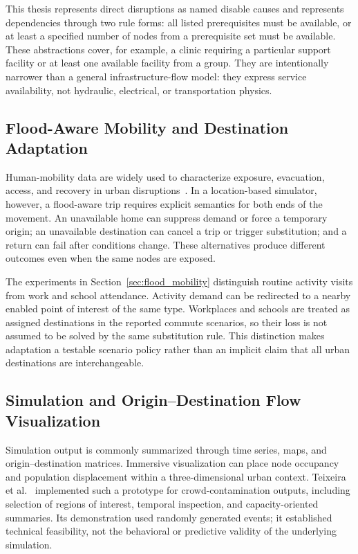 \documentclass[pdflatex,sn-mathphys-num]{sn-jnl}%
\theoremstyle{thmstyleone}%
\theoremstyle{thmstyletwo}%
\theoremstyle{thmstylethree}%
\begin{document}
This thesis represents direct disruptions as named disable causes and represents dependencies through two rule forms: all listed prerequisites must be available, or at least a specified number of nodes from a prerequisite set must be available. These abstractions cover, for example, a clinic requiring a particular support facility or at least one available facility from a group. They are intentionally narrower than a general infrastructure-flow model: they express service availability, not hydraulic, electrical, or transportation physics.

\subsection{Flood-Aware Mobility and Destination Adaptation}
\label{related:flood_mobility}

Human-mobility data are widely used to characterize exposure, evacuation, access, and recovery in urban disruptions~\citep{haraguchi2022mobilityDataReview}. In a location-based simulator, however, a flood-aware trip requires explicit semantics for both ends of the movement. An unavailable home can suppress demand or force a temporary origin; an unavailable destination can cancel a trip or trigger substitution; and a return can fail after conditions change. These alternatives produce different outcomes even when the same nodes are exposed.

The experiments in Section~\ref{sec:flood_mobility} distinguish routine activity visits from work and school attendance. Activity demand can be redirected to a nearby enabled point of interest of the same type. Workplaces and schools are treated as assigned destinations in the reported commute scenarios, so their loss is not assumed to be solved by the same substitution rule. This distinction makes adaptation a testable scenario policy rather than an implicit claim that all urban destinations are interchangeable.

\subsection{Simulation and Origin--Destination Flow Visualization}
\label{related:visualization}

Simulation output is commonly summarized through time series, maps, and origin--destination matrices. Immersive visualization can place node occupancy and population displacement within a three-dimensional urban context. Teixeira et al.~\citep{teixeira2024visualization} implemented such a prototype for crowd-contamination outputs, including selection of regions of interest, temporal inspection, and capacity-oriented summaries. Its demonstration used randomly generated events; it established technical feasibility, not the behavioral or predictive validity of the underlying simulation.
\end{document}
